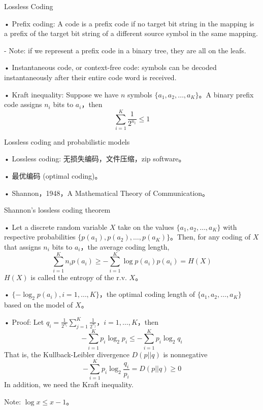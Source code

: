\documentclass[UTF8]{report}
\theoremstyle{MyLineTheoremStyle} %
\theoremstyle{MyBlockTheoremStyle} %
\theoremstyle{MySubsubsectionStyle} %
\begin{document}
\vspace{1cm}

Lossless Coding\par
• Prefix coding: A code is a prefix code if no target bit string in the mapping is a prefix of the target bit string of a different source symbol in the same mapping.\par
  - Note: if we represent a prefix code in a binary tree, they are all on the leafs.\par
• Instantaneous code, or context-free code: symbols can be decoded instantaneously after their entire code word is received.\par
• Kraft inequality: Suppose we have $n$ symbols $\{a_1, a_2, \ldots, a_K\}$。A binary prefix code assigns $n_i$ bits to $a_i$，then
\[
\sum_{i=1}^{K} \frac{1}{2^{n_i}} \leq 1
\]

\vspace{1cm}

Lossless coding and probabilistic models\par
• Lossless coding: 无损失编码，文件压缩，zip software。\par
• 最优编码 (optimal coding)。\par
• Shannon，1948，A Mathematical Theory of Communication。\par

\vspace{1cm}

Shannon’s lossless coding theorem\par
• Let a discrete random variable $X$ take on the values $\{a_1, a_2, \ldots, a_K\}$ with respective probabilities $\{p(a_1), p(a_2), \ldots, p(a_K)\}$。Then, for any coding of $X$ that assigns $n_i$ bits to $a_i$，the average coding length,
\[
\sum_{i=1}^{K} n_i p(a_i) \geq - \sum_{i=1}^{K} \log p(a_i) p(a_i) = H(X)
\]
$H(X)$ is called the entropy of the r.v. $X$。\par
• $\{-\log_2 p(a_i), i = 1, \ldots, K\}$，the optimal coding length of $\{a_1, a_2, \ldots, a_K\}$ based on the model of $X$。\par

• Proof: Let $q_i = \frac{1}{2^{n_i}} \sum_{j=1}^{K} \frac{1}{2^{n_j}}$，$i = 1, \ldots, K$，then
\[
-\sum_{i=1}^{K} p_i \log_2 p_i \leq -\sum_{i=1}^{K} p_i \log_2 q_i
\]
That is, the Kullback-Leibler divergence $D(p||q)$ is nonnegative
\[
-\sum_{i=1}^{K} p_i \log_2 \frac{q_i}{p_i} = D(p||q) \geq 0
\]
In addition, we need the Kraft inequality.\par
Note: $\log x \leq x - 1$。\par
\end{document}
